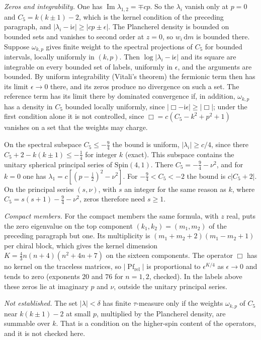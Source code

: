 \emph{Zeros and integrability.} One has \(\operatorname{Im}\lambda_{1,2}=\mp cp\). So the \(\lambda_i\) vanish only at \(p=0\) and \(C_5=k(k\pm1)-2\), which is the kernel condition of the preceding paragraph, and \(|\lambda_i-\mathrm i\epsilon|\ge|cp\pm\epsilon|\). The Plancherel density is bounded on bounded sets and vanishes to second order at \(z=0\), so \(w_i\,\mathrm dm\) is bounded there. Suppose \(\omega_{k,p}\) gives finite weight to the spectral projections of \(C_5\) for bounded intervals, locally uniformly in \((k,p)\). Then \(\log|\lambda_i-\mathrm i\epsilon|\) and its square are integrable on every bounded set of labels, uniformly in \(\epsilon\), and the arguments are bounded. By uniform integrability (Vitali's theorem) the fermionic term then has its limit \(\epsilon\to0\) there, and its zeros produce no divergence on such a set. The reference term has its limit there by dominated convergence if, in addition, \(\omega_{k,p}\) has a density in \(C_5\) bounded locally uniformly, since \(|\Box-\mathrm i\epsilon|\ge|\Box|\); under the first condition alone it is not controlled, since \(\Box=c(C_5-k^2+p^2+1)\) vanishes on a set that the weights may charge.

On the spectral subspace \(C_5\le-\tfrac94\) the bound is uniform, \(|\lambda_i|\ge c/4\), since there \(C_5+2-k(k\pm1)\le-\tfrac14\) for integer \(k\) (exact). This subspace contains the unitary spherical principal series of \(\mathrm{Spin}(4,1)\). There \(C_5=-\tfrac94-\nu^2\), and for \(k=0\) one has \(\lambda_1=c[(p-\tfrac{\mathrm i}2)^2-\nu^2]\). For \(-\tfrac94<C_5<-2\) the bound is \(c|C_5+2|\). On the principal series \((s,\nu)\), with \(s\) an integer for the same reason as \(k\), where \(C_5=s(s+1)-\tfrac94-\nu^2\), zeros therefore need \(s\ge1\).

\emph{Compact members.} For the compact members the same formula, with \(z\) real, puts the zero eigenvalue on the top component \((k_1,k_2)=(m_1,m_2)\) of the preceding paragraph but one. Its multiplicity is \((m_1+m_2+2)(m_1-m_2+1)\) per chiral block, which gives the kernel dimension \(K=\tfrac43n(n+4)(n^2+4n+7)\) on the sixteen components. The operator \(\Box\) has no kernel on the traceless matrices, so \(|\operatorname{Pf}_{\mathrm{rel}}|\) is proportional to \(\epsilon^{K/4}\) as \(\epsilon\to0\) and tends to zero (exponents \(20\) and \(76\) for \(n=1,2\), checked). In the labels above these zeros lie at imaginary \(p\) and \(\nu\), outside the unitary principal series.

\emph{Not established.} The set \(|\lambda|<\delta\) has finite \(\tau\)-measure only if the weights \(\omega_{k,p}\) of \(C_5\) near \(k(k\pm1)-2\) at small \(p\), multiplied by the Plancherel density, are summable over \(k\). That is a condition on the higher-spin content of the operators, and it is not checked here.

